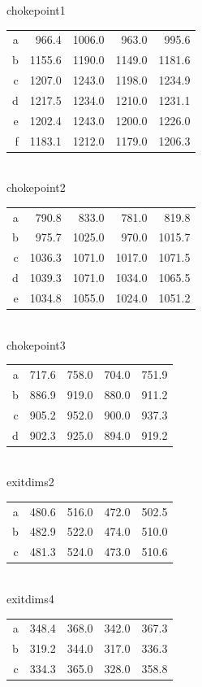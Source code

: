 \documentclass[12pt,letterpaper]{article}
\begin{document}
chokepoint1
\begin{tabular}{ r | r | r | r | r }
a &  966.4 & 1006.0 &  963.0 &  995.6 \\
b & 1155.6 & 1190.0 & 1149.0 & 1181.6 \\
c & 1207.0 & 1243.0 & 1198.0 & 1234.9 \\
d & 1217.5 & 1234.0 & 1210.0 & 1231.1 \\
e & 1202.4 & 1243.0 & 1200.0 & 1226.0 \\
f & 1183.1 & 1212.0 & 1179.0 & 1206.3 \\
\end{tabular}
\\
chokepoint2
\begin{tabular}{ r | r | r | r | r }
a &  790.8 &  833.0 &  781.0 &  819.8 \\
b &  975.7 & 1025.0 &  970.0 & 1015.7 \\
c & 1036.3 & 1071.0 & 1017.0 & 1071.5 \\
d & 1039.3 & 1071.0 & 1034.0 & 1065.5 \\
e & 1034.8 & 1055.0 & 1024.0 & 1051.2 \\
\end{tabular}
\\
chokepoint3
\begin{tabular}{ r | r | r | r | r }
a &  717.6 & 758.0 & 704.0 & 751.9 \\
b &  886.9 & 919.0 & 880.0 & 911.2 \\
c &  905.2 & 952.0 & 900.0 & 937.3 \\
d &  902.3 & 925.0 & 894.0 & 919.2 \\
\end{tabular}            
\\
exitdims2
\begin{tabular}{ r | r | r | r | r }
a & 480.6 & 516.0 & 472.0 & 502.5 \\
b & 482.9 & 522.0 & 474.0 & 510.0 \\
c & 481.3 & 524.0 & 473.0 & 510.6 \\
\end{tabular}                          
\\
exitdims4
\begin{tabular}{ r | r | r | r | r }
a & 348.4 & 368.0 & 342.0 & 367.3 \\
b & 319.2 & 344.0 & 317.0 & 336.3 \\
c & 334.3 & 365.0 & 328.0 & 358.8 \\
\end{tabular}
\\
\end{document}

